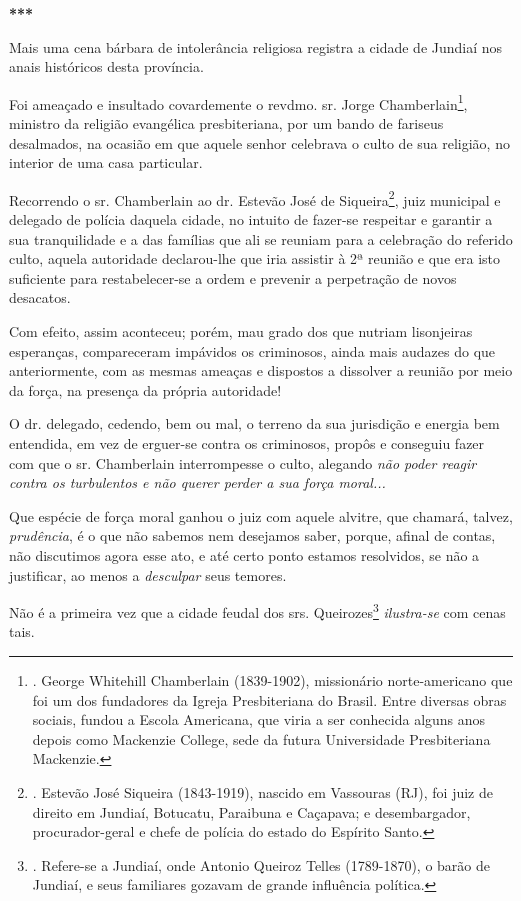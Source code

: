 \textbf{***}

Mais uma cena bárbara de intolerância religiosa registra a cidade de
Jundiaí nos anais históricos desta província.

Foi ameaçado e insultado covardemente o revdmo. sr. Jorge
Chamberlain\footnote{. George Whitehill Chamberlain (1839-1902),
  missionário norte-americano que foi um dos fundadores da Igreja
  Presbiteriana do Brasil. Entre diversas obras sociais, fundou a Escola
  Americana, que viria a ser conhecida alguns anos depois como Mackenzie
  College, sede da futura Universidade Presbiteriana Mackenzie.},
ministro da religião evangélica presbiteriana, por um bando de fariseus
desalmados, na ocasião em que aquele senhor celebrava o culto de sua
religião, no interior de uma casa particular.

Recorrendo o sr. Chamberlain ao dr. Estevão José de Siqueira\footnote{.
  Estevão José Siqueira (1843-1919), nascido em Vassouras (RJ), foi juiz
  de direito em Jundiaí, Botucatu, Paraibuna e Caçapava; e
  desembargador, procurador-geral e chefe de polícia do estado do
  Espírito Santo.}, juiz municipal e delegado de polícia daquela cidade,
no intuito de fazer-se respeitar e garantir a sua tranquilidade e a das
famílias que ali se reuniam para a celebração do referido culto, aquela
autoridade declarou-lhe que iria assistir à 2ª reunião e que era isto
suficiente para restabelecer-se a ordem e prevenir a perpetração de
novos desacatos.

Com efeito, assim aconteceu; porém, mau grado dos que nutriam
lisonjeiras esperanças, compareceram impávidos os criminosos, ainda mais
audazes do que anteriormente, com as mesmas ameaças e dispostos a
dissolver a reunião por meio da força, na presença da própria
autoridade!

O dr. delegado, cedendo, bem ou mal, o terreno da sua jurisdição e
energia bem entendida, em vez de erguer-se contra os criminosos, propôs
e conseguiu fazer com que o sr. Chamberlain interrompesse o culto,
alegando \emph{não poder reagir contra os turbulentos e não querer
perder a sua força moral...}

Que espécie de força moral ganhou o juiz com aquele alvitre, que
chamará, talvez, \emph{prudência}, é o que não sabemos nem desejamos
saber, porque, afinal de contas, não discutimos agora esse ato, e até
certo ponto estamos resolvidos, se não a justificar, ao menos a
\emph{desculpar} seus temores.

Não é a primeira vez que a cidade feudal dos srs. Queirozes\footnote{.
  Refere-se a Jundiaí, onde Antonio Queiroz Telles (1789-1870), o barão
  de Jundiaí, e seus familiares gozavam de grande influência política.}
\emph{ilustra-se} com cenas tais.

